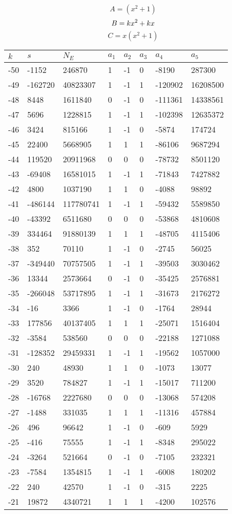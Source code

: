 \documentclass{amsart}
\begin{document}
$$A=(x^2
 + 1)$$
$$B=k\*x^2
 + k\*x$$
$$C=x(x^2
 + 1)$$
\begin{longtable}{|l|l|l|lllll|}
\hline
$k$ & $s$ & $N_E$ & $a_1$ & $a_2$ & $a_3$ & $a_4$ & $a_5$\\
\hline
-50&-1152&246870&1&-1&0&-8190&287300\\
-49&-162720&40823307&1&-1&1&-120902&16208500\\
-48&8448&1611840&0&-1&0&-111361&14338561\\
-47&5696&1228815&1&-1&1&-102398&12635372\\
-46&3424&815166&1&-1&0&-5874&174724\\
-45&22400&5668905&1&1&1&-86106&9687294\\
-44&119520&20911968&0&0&0&-78732&8501120\\
-43&-69408&16581015&1&-1&1&-71843&7427882\\
-42&4800&1037190&1&1&0&-4088&98892\\
-41&-486144&117780741&1&-1&1&-59432&5589850\\
-40&-43392&6511680&0&0&0&-53868&4810608\\
-39&334464&91880139&1&1&1&-48705&4115406\\
-38&352&70110&1&-1&0&-2745&56025\\
-37&-349440&70757505&1&-1&1&-39503&3030462\\
-36&13344&2573664&0&-1&0&-35425&2576881\\
-35&-266048&53717895&1&-1&1&-31673&2176272\\
-34&-16&3366&1&-1&0&-1764&28944\\
-33&177856&40137405&1&1&1&-25071&1516404\\
-32&-3584&538560&0&0&0&-22188&1271088\\
-31&-128352&29459331&1&-1&1&-19562&1057000\\
-30&240&48930&1&1&0&-1073&13077\\
-29&3520&784827&1&-1&1&-15017&711200\\
-28&-16768&2227680&0&0&0&-13068&574208\\
-27&-1488&331035&1&1&1&-11316&457884\\
-26&496&96642&1&-1&0&-609&5929\\
-25&-416&75555&1&-1&1&-8348&295022\\
-24&-3264&521664&0&-1&0&-7105&232321\\
-23&-7584&1354815&1&-1&1&-6008&180202\\
-22&240&42570&1&-1&0&-315&2225\\
-21&19872&4340721&1&1&1&-4200&102576\\

\end{longtable}
\end{document}
